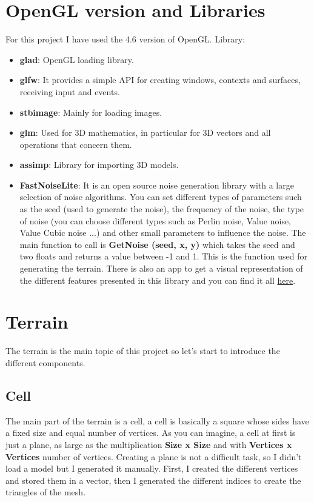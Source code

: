 \section{OpenGL version and Libraries}
For this project I have used the 4.6 version of OpenGL.
Library:

\begin{itemize}
	\item \textbf{glad}: OpenGL loading library.
	\item \textbf{glfw}: It provides a simple API for creating windows, contexts and surfaces, receiving input and events.
	\item \textbf{stb\textunderscore image}: Mainly for loading images.
	\item \textbf{glm}: Used for 3D mathematics, in particular for 3D vectors and all operations that concern them. 
	\item \textbf{assimp}: Library for importing 3D models.
	\item \textbf{FastNoiseLite}: It is an open source noise generation library with a large selection of noise algorithms. You can set different types of parameters such as the seed (used to generate the noise), the frequency of the noise, the type of noise (you can choose different types such as Perlin noise, Value noise, Value Cubic noise ...) and other small parameters to influence the noise. The main function to call is \textbf{GetNoise (seed, x, y)} which takes the seed and two floats and returns a value between -1 and 1. This is the function used for generating the terrain. 
	There is also an app to get a visual representation of the different features presented in this library and you can find it all \href{https://github.com/Auburn/FastNoiseLite}{here}.
	
\end{itemize}

\newpage

\section{Terrain}

The terrain is the main topic of this project so let's start to introduce the different components.

\subsection{Cell}
\noindent
The main part of the terrain is a cell, a cell is basically a square whose sides have a fixed  size and equal number of vertices. As you can imagine, a cell at first is just a plane, as large as the multiplication \textbf {Size x Size} and with \textbf {Vertices x Vertices} number of vertices. Creating a plane is not a difficult task, so I didn't load a model but I generated it manually. First, I created the different vertices and stored them in a vector, then I generated the different indices to create the triangles of the mesh.

